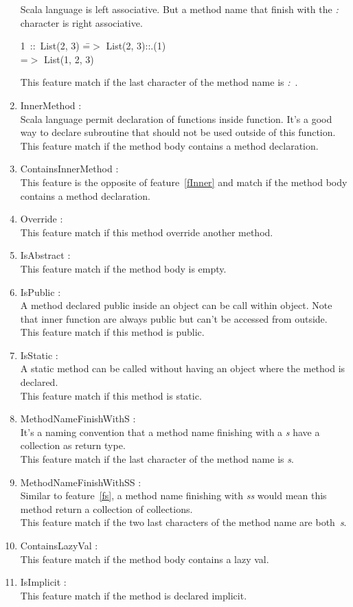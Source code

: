 \documentclass[12pt]{article}
\newcommand{\code}[1]{{\fontfamily{phv}\selectfont \small{\begin{tabbing} #1 \end{tabbing}}}}
\begin{document}
\begin{enumerate}
	Scala language is left associative. But a method name that finish with the \textit{:} character is right associative.
\code{
1\ ::\ List(2, 3) \==$>$ List(2, 3)::.(1)\\
\>=$>$ List(1, 2, 3)
}
This feature match if the last character of the method name is \textit{:}\ .
\item InnerMethod :\label{fInner}\\
	Scala language permit declaration of functions inside function. It's a good way to declare subroutine that should not be used outside of this function.\\
This feature match if the method body contains a method declaration.
\item ContainsInnerMethod :\\
	This feature is the opposite of feature~\ref{fInner} and match if the method body contains a method declaration.
\item Override : \\
	This feature match if this method override another method.
\item IsAbstract :\\
	This feature match if the method body is empty.
\item IsPublic  :\label{fPublic}\\
	A method declared public inside an object can be call within object. Note that inner function are always public but can't be accessed from outside.\\
This feature match if this method is public.
\item IsStatic :\\
	A static method can be called without having an object where the method is declared.\\
This feature match if this method is static. 
\item MethodNameFinishWithS :\label{fs}\\
	It's a naming convention that a method name finishing with a \textit{s} have a collection as return type.\\
This feature match if the last character of the method name is \textit{s}.
\item MethodNameFinishWithSS : \label{fss} \\
	Similar to feature~\ref{fs}, a method name finishing with \textit{ss} would mean this method return a collection of collections.\\ 
	This feature match if the two last characters of the method name are both~\textit{s}.
\item ContainsLazyVal :\\
	This feature match if the method body contains a lazy val.
\item IsImplicit : \\
	This feature match if the method is declared implicit.

\end{enumerate}
\end{document}

